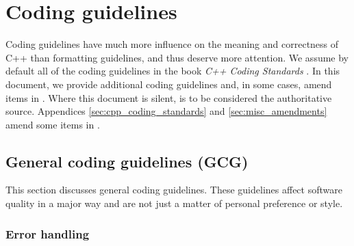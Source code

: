 %
\section{Coding guidelines}
\label{tcdg:codingguidelines:sec}
%

Coding guidelines have much more influence on the meaning and
correctness of C++ than formatting guidelines, and thus deserve more
attention.  We assume by default all of the coding guidelines in the
book \emph{C++ Coding Standards} \cite{C++CodingStandards05}.  In this
document, we provide additional coding guidelines and, in some cases,
amend items in {}\cite{C++CodingStandards05}.  Where this document is
silent, {}\cite{C++CodingStandards05} is to be considered the
authoritative source.  Appendices \ref{sec:cpp_coding_standards} and
\ref{sec:misc_amendments} amend some items in
\cite{C++CodingStandards05}.

%
\subsection{General coding guidelines (GCG)}
%

This section discusses general coding guidelines.  These guidelines
affect software quality in a major way and are not just a matter of
personal preference or style.

%
\subsubsection{Error handling}
%

